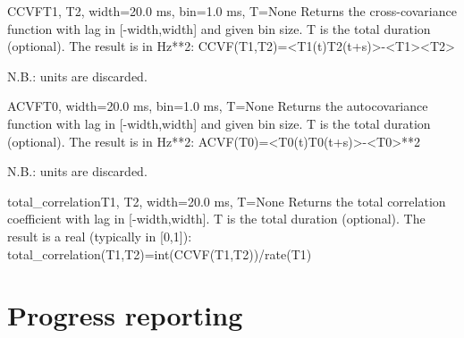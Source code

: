 \documentclass[letterpaper,10pt,english]{manual}
\begin{document}
\hypertarget{brian.CCVF}{}\begin{funcdesc}{CCVF}{T1, T2, width=20.0 ms, bin=1.0 ms, T=None}
Returns the cross-covariance function with lag in {[}-width,width{]} and given bin size.
T is the total duration (optional).
The result is in Hz**2:
CCVF(T1,T2)=\textless{}T1(t)T2(t+s)\textgreater{}-\textless{}T1\textgreater{}\textless{}T2\textgreater{}

N.B.: units are discarded.
\end{funcdesc}

\hypertarget{brian.ACVF}{}\begin{funcdesc}{ACVF}{T0, width=20.0 ms, bin=1.0 ms, T=None}
Returns the autocovariance function with lag in {[}-width,width{]} and given bin size.
T is the total duration (optional).
The result is in Hz**2:
ACVF(T0)=\textless{}T0(t)T0(t+s)\textgreater{}-\textless{}T0\textgreater{}**2

N.B.: units are discarded.
\end{funcdesc}

\hypertarget{brian.total_correlation}{}\begin{funcdesc}{total\_correlation}{T1, T2, width=20.0 ms, T=None}
Returns the total correlation coefficient with lag in {[}-width,width{]}.
T is the total duration (optional).
The result is a real (typically in {[}0,1{]}):
total\_correlation(T1,T2)=int(CCVF(T1,T2))/rate(T1)
\end{funcdesc}

\resetcurrentobjects
\hypertarget{--doc-reference-progressreporting}{}

\hypertarget{index-141}{}\section{Progress reporting}
\end{document}
